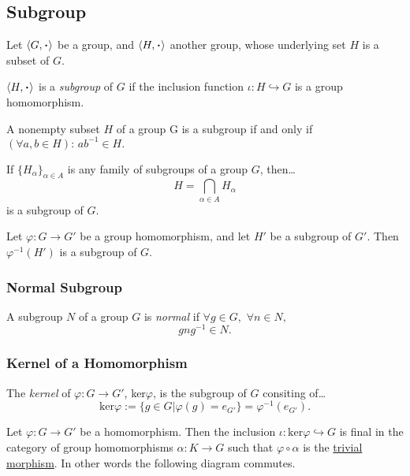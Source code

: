 \subsection{Subgroup}\label{subgroup}
Let $\langle G, \LargerCdot \rangle$ be a group, and $\langle H, \LargerCdot \rangle$ another group, whose underlying set $H$
is a subset of $G$.\newline

\noindent $\langle H, \LargerCdot \rangle$ is a \emph{subgroup} of $G$ if the inclusion function $\iota : H \hookrightarrow G$
is a group homomorphism.

\begin{proposition}
\label{subgroupcondition}
A nonempty subset $H$ of a group G is a subgroup if and only if $(\forall a,b \in H): \, ab^{-1}\in H.$
\end{proposition}

\begin{lemma}
If $\{ H_{\alpha} \}_{\alpha \in A}$ is any family of subgroups of a group $G$, then\dots
$$H = \bigcap_{\alpha \in A}H_{\alpha}$$
is a subgroup of $G$.
\end{lemma}

\begin{lemma}
\label{preimagesubgroup}
Let $\varphi : G \rightarrow G'$ be a group homomorphism, and let $H'$ be a subgroup of $G'$. Then
$\varphi^{-1}(H')$ is a subgroup of $G$.
\end{lemma}

\subsubsection{Normal Subgroup}\label{normalsubgroup}
A subgroup $N$ of a group $G$ is \emph{normal} if $\forall g \in G,$ $\forall n \in N,$
$$gng^{-1} \in N.$$

\subsubsection{Kernel of a Homomorphism}\label{kernelhomomorphism}
The \emph{kernel} of $\varphi : G \rightarrow G'$, ker$\varphi$, is the subgroup of $G$ consiting of\dots
$$\textrm{ker}\varphi := \{ g \in G | \varphi(g) = e_{G'} \} = \varphi^{-1}(e_{G'}).$$

\begin{proposition}
Let $\varphi : G \rightarrow G'$ be a homomorphism. Then the inclusion $\iota : \textrm{ker}\varphi \hookrightarrow G$
is final in the category of group homomorphisms $\alpha : K \rightarrow G$ such that $\varphi \circ \alpha$ is the
\hyperref[trivialmorphism]{trivial morphism}. In other words the following diagram commutes.
\begin{figure}[H]
\centering

\end{figure}
\end{proposition}

